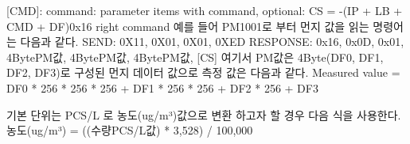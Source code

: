 \documentclass[11pt
  , a4paper
  , article
  , oneside
]{memoir}
\begin{document}
[CMD]: command\newline
[DF]: parameter items with command, optional\newline
[CS]: CS = -(IP + LB + CMD + DF)\newline
[ACK] 0x16 right command\newline
\newline
예를 들어 PM1001로 부터 먼지 값을 읽는 명령어는 다음과 같다.\newline\newline
        SEND: 0X11, 0X01, 0X01, 0XED\newline\newline
        RESPONSE: 0x16, 0x0D, 0x01, 4BytePM값, 4BytePM값, 4BytePM값, [CS]\newline\newline
여기서 PM값은 4Byte(DF0, DF1, DF2, DF3)로 구성된 먼지 데이터 값으로 측정 값은 다음과 같다.\newline\newline
        Measured value = DF0 * 256 * 256 * 256 + DF1 * 256 * 256 + DF2 * 256 + DF3\newline

기본 단위는 PCS/L 로 농도(ug/m³)값으로  변환 하고자 할 경우 다음 식을 사용한다.\newline
\newline
        농도(ug/m³) = ((수량PCS/L값) * 3,528) / 100,000\newline
\end{document}
